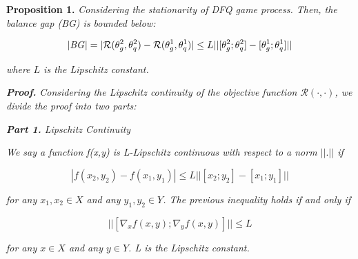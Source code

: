 \noindent \textbf{Proposition 1.} \emph{Considering the stationarity of DFQ game process. Then, the balance gap (BG) is bounded below: }
\begin{small}
\begin{equation}
\begin{aligned}
|\text{\emph{BG}}|=|\mathcal{R}(\theta^2_g,\theta^2_q)-\mathcal{R}(\theta_g^1,\theta_q^1)| \le L||[\theta^2_g;\theta^2_q]-[\theta_g^1;\theta_q^1]||
\end{aligned}
\label{bg_upper}
\end{equation}
\end{small}
\emph{where $L$ is the Lipschitz constant.}

\noindent \emph{\textbf{Proof.} }
\emph{Considering the Lipschitz continuity of the objective function $\mathcal{R}(\cdot,\cdot)$, we divide the proof into two parts: }


\noindent \emph{\textbf{Part 1.} Lipschitz Continuity}

\noindent \emph{We say a function f(x,y) is L-Lipschitz continuous with respect to a norm $||.||$ if }
\begin{small}
\begin{equation}
|f(x_2,y_2)-f(x_1,y_1)| \le L||[x_2;y_2] - [x_1;y_1]||
\label{}
\end{equation}
\end{small}
\emph{for any $x_1,x_2\in X$ and any $y_1,y_2\in Y$. The previous inequality holds if and
only if}
\begin{small}
\begin{equation}
||[\nabla_x f(x,y);\nabla_y f(x,y)]|| \le L
\label{}
\end{equation}
\end{small}
\emph{for any $x\in X$ and any $y\in Y$. L is the Lipschitz constant.}


